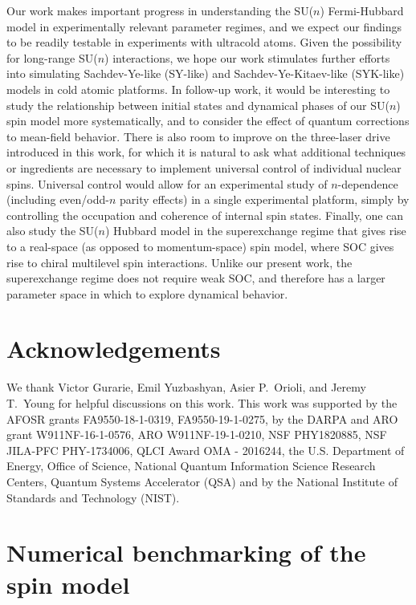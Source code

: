 \documentclass[aps,pra,nofootinbib,twocolumn,superscriptaddress]{revtex4-2}
\newcommand{\1}{\mathds{1}}
\begin{document}
Our work makes important progress in understanding the SU($n$) Fermi-Hubbard model in experimentally relevant parameter regimes, and we expect our findings to be readily testable in experiments with ultracold atoms.
Given the possibility for long-range SU($n$) interactions, we hope our work stimulates further efforts into simulating Sachdev-Ye-like (SY-like) and Sachdev-Ye-Kitaev-like (SYK-like) models \cite{sachdev1993gapless, bentsen2019integrable} in cold atomic platforms.
In follow-up work, it would be interesting to study the relationship between initial states and dynamical phases of our SU($n$) spin model more systematically, and to consider the effect of quantum corrections to mean-field behavior.
There is also room to improve on the three-laser drive introduced in this work, for which it is natural to ask what additional techniques or ingredients are necessary to implement universal control of individual nuclear spins.
Universal control would allow for an experimental study of $n$-dependence (including even/odd-$n$ parity effects) in a single experimental platform, simply by controlling the occupation and coherence of internal spin states.
Finally, one can also study the SU($n$) Hubbard model in the superexchange regime that gives rise to a real-space (as opposed to momentum-space) spin model, where SOC gives rise to chiral multilevel spin interactions.
Unlike our present work, the superexchange regime does not require weak SOC, and therefore has a larger parameter space in which to explore dynamical behavior.

\section*{Acknowledgements}

We thank Victor Gurarie, Emil Yuzbashyan, Asier P.~Orioli, and Jeremy T.~Young for helpful discussions on this work.
This work was supported by the AFOSR grants FA9550-18-1-0319, FA9550-19-1-0275, by the DARPA and ARO grant W911NF-16-1-0576, ARO W911NF-19-1-0210, NSF PHY1820885, NSF JILA-PFC PHY-1734006, QLCI Award OMA - 2016244, the U.S. Department of Energy, Office of Science, National Quantum Information Science Research Centers, Quantum Systems Accelerator (QSA) and by the National Institute of Standards and Technology (NIST).


\onecolumngrid
\appendix

\section{Numerical benchmarking of the spin model}
\label{sec:benchmarking}
\end{document}
